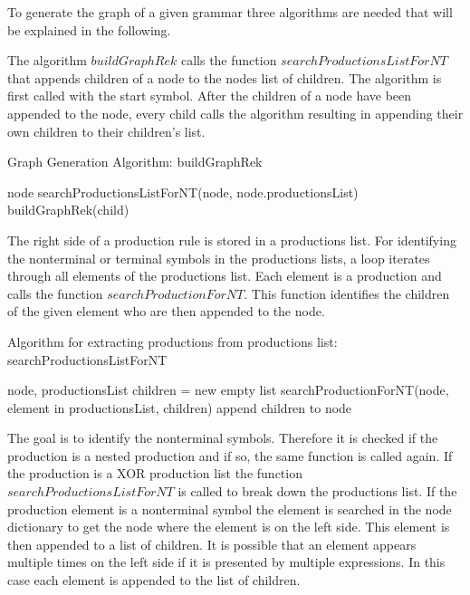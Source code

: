 To generate the graph of a given grammar three algorithms are needed that will be explained in the following.

The algorithm $buildGraphRek$ calls the function $searchProductionsListForNT$ that appends children of a node to the nodes list of children.
The algorithm is first called with the start symbol.
After the children of a node have been appended to the node, every child calls the algorithm resulting in appending their own children to their children's list.

\begin{algorithm}[H]
\caption{Graph Generation Algorithm: buildGraphRek}
\begin{algorithmic}[1] 
\Require node
\State searchProductionsListForNT(node, node.productionsList)
		\State buildGraphRek(child)
	\EndFor
\EndIf
\end{algorithmic}
\end{algorithm}

The right side of a production rule is stored in a productions list.
For identifying the nonterminal or terminal symbols in the productions lists, a loop iterates through all elements of the productions list.
Each element is a production and calls the function $searchProductionForNT$.
This function identifies the children of the given element who are then appended to the node.

\begin{algorithm}[H]
\caption{Algorithm for extracting productions from productions list: searchProductionsListForNT}
\begin{algorithmic}[1] 
\Require node, productionsList
	\State children = new empty list
	\State searchProductionForNT(node, element in productionsList, children)
	\State append children to node
\EndFor
\end{algorithmic}
\end{algorithm}

The goal is to identify the nonterminal symbols.
Therefore it is checked if the production is a nested production and if so, the same function is called again.
If the production is a XOR production list the function $searchProductionsListForNT$ is called to break down the productions list.
If the production element is a nonterminal symbol the element is searched in the node dictionary to get the node where the element is on the left side.
This element is then appended to a list of children. It is possible that an element appears multiple times on the left side if it is presented by multiple expressions.
In this case each element is appended to the list of children.

